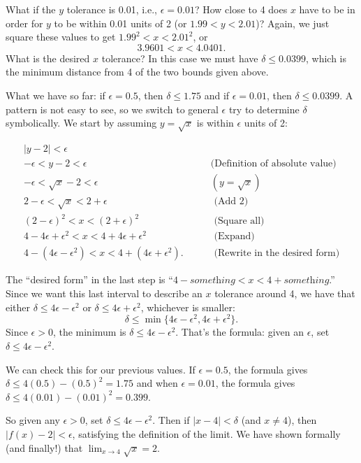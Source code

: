 {What if the $y$ tolerance is 0.01, i.e.,  $\epsilon =0.01$?  How close to 4 does $x$ have to be in order for $y$ to be within 0.01 units of 2 (or $1.99 < y < 2.01$)?  Again, we just square these values to get
$1.99^2 < x < 2.01^2$, or 
$$3.9601 < x < 4.0401.$$  
What is the desired $x$ tolerance?  In this case we must have $\delta \leq 0.0399$, which is the minimum distance from 4 of the two bounds given above.  %

What we have so far: if $\epsilon =0.5$, then $\delta \leq 1.75$ and if $\epsilon = 0.01$, then $\delta \leq 0.0399$. A pattern is not easy to see, so we switch to general $\epsilon$ try to determine $\delta$ symbolically.  We start by assuming $y=\sqrt{x}$ is within $\epsilon$ units of 2:

\begin{eqnarray*}
|y - 2| < \epsilon &\\
-\epsilon < y - 2 < \epsilon& \qquad \textrm{(Definition of absolute value)}\\
-\epsilon < \sqrt{x} - 2 < \epsilon  &\qquad (y=\sqrt{x})\\
2 - \epsilon < \sqrt{x} < 2+ \epsilon &\qquad \textrm{ (Add 2)}\\
(2 - \epsilon)^2 < x < (2+ \epsilon) ^2 &\qquad \textrm{ (Square all)}\\
4 - 4\epsilon + \epsilon^2 < x < 4 + 4\epsilon + \epsilon^2 &\qquad \textrm{ (Expand)}\\
4 - (4\epsilon - \epsilon^2) < x < 4 + (4\epsilon + \epsilon^2). &\qquad \textrm{ (Rewrite in the desired form)}
\end{eqnarray*}

The ``desired form'' in the last step is ``$4-\textit{something} < x < 4 +\textit{something}$.''
Since we want this last interval to describe an $x$ tolerance around 4, we have that either $\delta \leq 4\epsilon - \epsilon^2$ or $\delta \leq 4\epsilon + \epsilon^2$, whichever is smaller: $$\delta \leq \min\{4\epsilon - \epsilon^2, 4\epsilon + \epsilon^2\}.$$  Since $\epsilon > 0$, the minimum is $\delta \leq 4\epsilon - \epsilon^2$.  That's the formula: given an $\epsilon$, set $\delta \leq 4\epsilon-\epsilon^2$. 

We can check this for our previous values.  If $\epsilon=0.5$, the formula gives
$\delta \leq 4(0.5) - (0.5)^2 = 1.75$ and when $\epsilon=0.01$, the formula gives $\delta \leq 4(0.01) - (0.01)^2 = 0.399$.

So given any $\epsilon >0$, set $\delta \leq 4\epsilon - \epsilon^2$. Then if $|x-4|<\delta$ (and $x\neq 4$), then $|f(x) - 2| < \epsilon$,  satisfying the definition of the limit.  We have shown formally (and finally!) that $\displaystyle \lim_{x\rightarrow 4} \sqrt{x} = 2 $.
}\\

